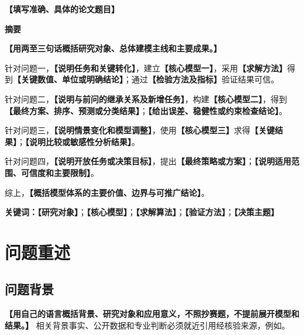 \documentclass[UTF8,a4paper,12pt,zihao=-4]{ctexart}
\newcommand{\TemplateField}[1]{\textbf{【#1】}}
\newcommand{\PaperTitle}{\TemplateField{填写准确、具体的论文题目}}
\begin{document}
\setcounter{page}{1}

\thispagestyle{fancy}
\begin{center}
  {\bfseries{}\PaperTitle\par}
  \vspace{1.2em}
  {\bfseries{}摘要\par}
\end{center}

\indent\TemplateField{用两至三句话概括研究对象、总体建模主线和主要成果。}

针对问题一，\TemplateField{说明任务和关键转化}，建立\textbf{【核心模型一】}，采用\TemplateField{求解方法}得到\textbf{【关键数值、单位或明确结论】}；通过\TemplateField{检验方法及指标}验证结果可信。

针对问题二，\TemplateField{说明与前问的继承关系及新增任务}，构建\textbf{【核心模型二】}，得到\textbf{【最终方案、排序、预测或分类结果】}；\TemplateField{给出误差、稳健性或约束检查结论}。

针对问题三，\TemplateField{说明情景变化和模型调整}，使用\textbf{【核心模型三】}求得\textbf{【关键结果】}；\TemplateField{说明比较或敏感性分析结果}。

针对问题四，\TemplateField{说明开放任务或决策目标}，提出\textbf{【最终策略或方案】}；\TemplateField{说明适用范围、可信度和主要限制}。

综上，\textbf{【概括模型体系的主要价值、边界与可推广结论】}。

\vspace{0.8em}
\noindent\textbf{关键词：}\TemplateField{研究对象}；\TemplateField{核心模型}；\TemplateField{求解算法}；\TemplateField{验证方法}；\TemplateField{决策主题}

\clearpage

\section{问题重述}

\subsection{问题背景}
\TemplateField{用自己的语言概括背景、研究对象和应用意义，不照抄赛题，不提前展开模型和结果。}
相关背景事实、公开数据和专业判断必须就近引用经核验来源，例如\cite{topic-ref-1,topic-ref-2}。
\end{document}
